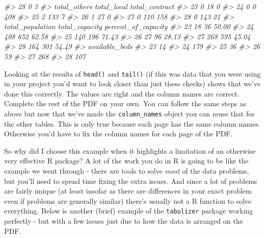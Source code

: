 \documentclass[
  12pt,
  openany]{book}
\newenvironment{Shaded}{\begin{snugshade}}{\end{snugshade}}
\newcommand{\CommentTok}[1]{\textcolor[rgb]{0.37,0.37,0.37}{\textit{#1}}}
\begin{document}
\begin{Shaded}
\begin{Highlighting}[]
\CommentTok{\#\textgreater{} 28                        0                          3}
\CommentTok{\#\textgreater{}    total\_others total\_local total\_contract}
\CommentTok{\#\textgreater{} 23            0          18              0}
\CommentTok{\#\textgreater{} 24            0           0            408}
\CommentTok{\#\textgreater{} 25            2         133              7}
\CommentTok{\#\textgreater{} 26            1          27              0}
\CommentTok{\#\textgreater{} 27            0         110            158}
\CommentTok{\#\textgreater{} 28            0         143             21}
\CommentTok{\#\textgreater{}    total\_population total\_capacity percent\_of\_capacity}
\CommentTok{\#\textgreater{} 23               18             36               50.00}
\CommentTok{\#\textgreater{} 24              408            652               62.58}
\CommentTok{\#\textgreater{} 25              140            196               71.43}
\CommentTok{\#\textgreater{} 26               27             96               28.13}
\CommentTok{\#\textgreater{} 27              268            595               45.04}
\CommentTok{\#\textgreater{} 28              164            301               54.49}
\CommentTok{\#\textgreater{}    available\_beds}
\CommentTok{\#\textgreater{} 23             14}
\CommentTok{\#\textgreater{} 24            179}
\CommentTok{\#\textgreater{} 25             36}
\CommentTok{\#\textgreater{} 26             59}
\CommentTok{\#\textgreater{} 27            268}
\CommentTok{\#\textgreater{} 28            107}
\end{Highlighting}
\end{Shaded}

Looking at the results of \texttt{head()} and \texttt{tail()} (if this was data that you were using in your project you'd want to look closer than just these checks) shows that we've done this correctly. The values are right and the column names are correct. Complete the rest of the PDF on your own. You can follow the same steps as above but now that we've made the \texttt{column\_names} object you can reuse that for the other tables. This is only true because each page has the same column names. Otherwise you'd have to fix the column names for each page of the PDF.

So why did I choose this example when it highlights a limitation of an otherwise very effective R package? A lot of the work you do in R is going to be like the example we went through - there are tools to solve \emph{most} of the data problems, but you'll need to spend time fixing the extra issues. And since a lot of problems are fairly unique (at least insofar as there are differences in your exact problem even if problems are generally similar) there's usually not a R function to solve everything. Below is another (brief) example of the \texttt{tabulizer} package working perfectly - but with a few issues just due to how the data is arranged on the PDF.
\end{document}
